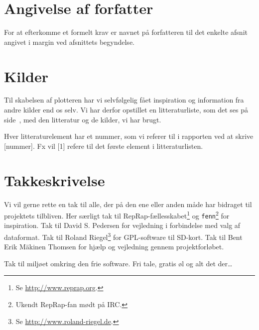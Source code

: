 

\section{Angivelse af forfatter}

For at efterkomme et formelt krav er navnet på forfatteren til det
enkelte afsnit angivet i margin ved afsnittets begyndelse.


\section{Kilder}
Til skabelsen af plotteren har vi selvfølgelig fået inspiration og
information fra andre kilder end os selv. Vi har derfor opstillet en
litteraturliste, som det ses på side~\pageref{ch:litteratur}, med den
litteratur og de kilder, vi har brugt.

Hver litteraturelement har et nummer, som vi referer til i rapporten
ved at skrive [nummer]. Fx vil [1] refere til det første element i
litteraturlisten.


\section{Takkeskrivelse}


Vi vil gerne rette en tak til alle, der på den ene eller anden måde
har bidraget til projektets tilbliven. Her særligt tak til
RepRap-fællesskabet\footnote{Se \url{http://www.reprap.org}.} og
\texttt{fenn}\footnote{Ukendt RepRap-fan mødt på IRC.} for
inspiration. Tak til David S. Pedersen for vejledning i forbindelse
med valg af dataformat. Tak til Roland Riegel\footnote{Se
  \url{http://www.roland-riegel.de}.} for GPL-software til
SD-kort. Tak til Bent Erik Mäkinen Thomsen for hjælp og vejledning
gennem projektforløbet.

Tak til miljøet omkring den frie software. Fri tale, gratis øl og alt
det der\dots {}


